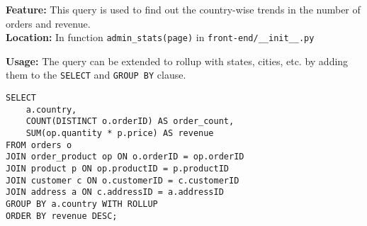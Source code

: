 \textbf{Feature:} This query is used to find out the country-wise trends in the number of orders and revenue. \\
\textbf{Location:} In function \texttt{admin\_stats(page)} in \texttt{front-end/\_\_init\_\_.py}

\textbf{Usage:}
The query can be extended to rollup with states, cities, etc. by adding them to the \texttt{SELECT} and \texttt{GROUP BY} clause.

\begin{lstlisting}
SELECT
    a.country,
    COUNT(DISTINCT o.orderID) AS order_count,
    SUM(op.quantity * p.price) AS revenue
FROM orders o
JOIN order_product op ON o.orderID = op.orderID
JOIN product p ON op.productID = p.productID
JOIN customer c ON o.customerID = c.customerID
JOIN address a ON c.addressID = a.addressID
GROUP BY a.country WITH ROLLUP
ORDER BY revenue DESC;
\end{lstlisting}